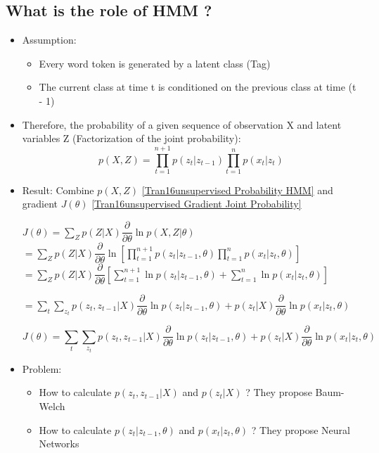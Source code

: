 \documentclass{article}
\begin{document}
\subsection{What is the role of HMM ?}
\begin{itemize}
\item Assumption:
	\begin{itemize}
	\item Every word token is generated by a latent class (Tag)
	\item The current class at time t is conditioned on the previous class at time (t - 1)
	\end{itemize}

\item Therefore, the probability of a given sequence of observation X and latent variables Z (Factorization of the joint probability):
	\begin{equation}
	p(X,Z) = \prod_{t=1}^{n + 1} p(z_{t}|z_{t-1})\prod_{t=1}^{n} p(x_{t}|z_{t})
	\label{Tran16unsupervised Probability HMM}
	\end{equation}
	
\item Result: Combine $p(X,Z)$ \eqref{Tran16unsupervised Probability HMM} and gradient $J(\theta)$ \eqref{Tran16unsupervised Gradient Joint Probability}

$J(\theta) = \sum_{Z} p(Z|X) \dfrac{\partial}{\partial\theta} \ln p(X,Z| \theta)$ \\

$ = \sum_{Z} p(Z|X) \dfrac{\partial}{\partial\theta} \ln [\prod_{t=1}^{n + 1} p(z_{t}|z_{t-1},\theta)\prod_{t=1}^{n} p(x_{t}|z_{t},\theta) ]$ \\

$ = \sum_{Z} p(Z|X) \dfrac{\partial}{\partial\theta}  [\sum_{t=1}^{n + 1} \ln p(z_{t}|z_{t-1},\theta) + \sum_{t=1}^{n} \ln p(x_{t}|z_{t},\theta) ]$

$ = \sum_{t}\sum_{z_{t}} p(z_{t}, z_{t-1}|X) \dfrac{\partial}{\partial\theta} \ln p(z_{t}|z_{t-1},\theta) + p(z_{t}|X) \dfrac{\partial}{\partial\theta} \ln p(x_{t}|z_{t},\theta) $

\begin{equation}
	J(\theta) = \sum_{t}\sum_{z_{t}} p(z_{t}, z_{t-1}|X) \dfrac{\partial}{\partial\theta} \ln p(z_{t}|z_{t-1},\theta) + p(z_{t}|X) \dfrac{\partial}{\partial\theta} \ln p(x_{t}|z_{t},\theta)
\end{equation}

\item Problem:
	\begin{itemize}
	\item How to calculate $p(z_{t}, z_{t-1}|X)$ and $p(z_{t}|X)$ ? They propose Baum-Welch
	\item How to calculate $p(z_{t}|z_{t-1},\theta)$ and $p(x_{t}|z_{t},\theta)$ ? They propose Neural Networks
	\end{itemize}
\end{itemize}
\end{document}
